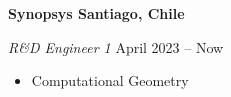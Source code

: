 \documentclass[../main.tex]{subfiles}
\begin{document}
    \textbf{Synopsys \hfill  Santiago, Chile} \par
    \textit{R\&D Engineer 1} \hfill April 2023 -- Now \par
    \begin{itemize}
        \item Computational Geometry
\end{itemize} \par
\end{document}
